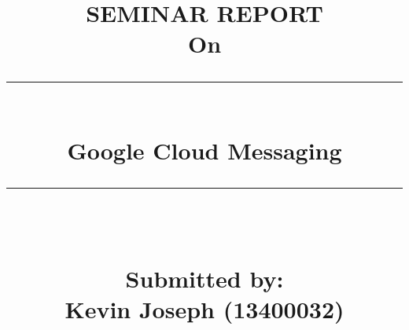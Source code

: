 %
%
%
% 
%
%

\documentclass[23pt]{article}
\usepackage[margin=1in, paperwidth=21cm, paperheight=29.7cm]{geometry}
\usepackage[pdftex]{color,graphicx}
\usepackage[english]{babel}
\usepackage[utf8x]{inputenc}
\usepackage{amsmath}
\usepackage[colorinlistoftodos]{todonotes}
\usepackage{cite}
\usepackage{listings}
\usepackage[nodayofweek]{datetime}
\usepackage{setspace}
\usepackage{fancyhdr}
\newcommand{\HRule}{\rule{\linewidth}{0.5mm}}

\nocite{*}
\title{\begin{center}
\bf SEMINAR REPORT\\
\vspace{0.5cm} On\\
\HRule \\[0.4cm]
{ \huge \bfseries Google Cloud Messaging}\\[0.4cm] %
\HRule \\[0.4 cm]
\vspace{0.5cm} \begin{Large} Submitted by:\\ 
\vspace{.35cm}Kevin Joseph (13400032)
\end{Large}
\end{center}}
\vspace{.5cm}
\date{}


